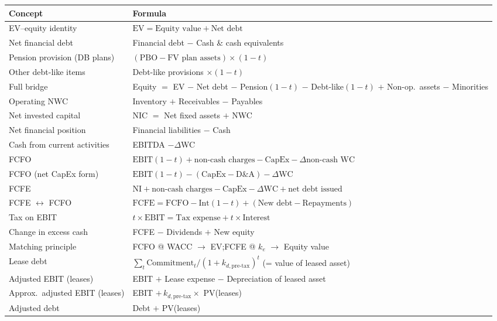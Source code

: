 \begin{center}
\small
\renewcommand{\arraystretch}{1.4}
\begin{longtable}{@{}p{4.6cm}p{10.4cm}@{}}
\toprule
\textbf{Concept} & \textbf{Formula}\\
\midrule
\endhead
EV--equity identity & $\text{EV}=\text{Equity value}+\text{Net debt}$\\
Net financial debt & Financial debt $-$ Cash \& cash equivalents\\
Pension provision (DB plans) & $(\text{PBO}-\text{FV plan assets})\times(1-t)$\\
Other debt-like items & Debt-like provisions $\times(1-t)$\\
Full bridge & Equity $=$ EV $-$ Net debt $-$ Pension$(1-t)$ $-$ Debt-like$(1-t)$ $+$ Non-op.\ assets $-$ Minorities\\
Operating NWC & Inventory $+$ Receivables $-$ Payables\\
Net invested capital & NIC $=$ Net fixed assets $+$ NWC\\
Net financial position & Financial liabilities $-$ Cash\\
Cash from current activities & EBITDA $-\Delta$WC\\
FCFO & $\text{EBIT}(1-t)+\text{non-cash charges}-\text{CapEx}-\Delta\text{non-cash WC}$\\
FCFO (net CapEx form) & $\text{EBIT}(1-t)-(\text{CapEx}-\text{D\&A})-\Delta\text{WC}$\\
FCFE & $\text{NI}+\text{non-cash charges}-\text{CapEx}-\Delta\text{WC}+\text{net debt issued}$\\
FCFE $\leftrightarrow$ FCFO & $\text{FCFE}=\text{FCFO}-\text{Int}(1-t)+(\text{New debt}-\text{Repayments})$\\
Tax on EBIT & $t\times\text{EBIT}=\text{Tax expense}+t\times\text{Interest}$\\
Change in excess cash & FCFE $-$ Dividends $+$ New equity\\
Matching principle & FCFO @ WACC $\to$ EV;\quad FCFE @ $k_e$ $\to$ Equity value\\
Lease debt & $\sum_t \text{Commitment}_t/(1+k_{d,\text{pre-tax}})^t$ \quad (= value of leased asset)\\
Adjusted EBIT (leases) & EBIT $+$ Lease expense $-$ Depreciation of leased asset\\
Approx.\ adjusted EBIT (leases) & EBIT $+\,k_{d,\text{pre-tax}}\times$ PV(leases)\\
Adjusted debt & Debt $+$ PV(leases)\\

\end{longtable}
\end{center}
